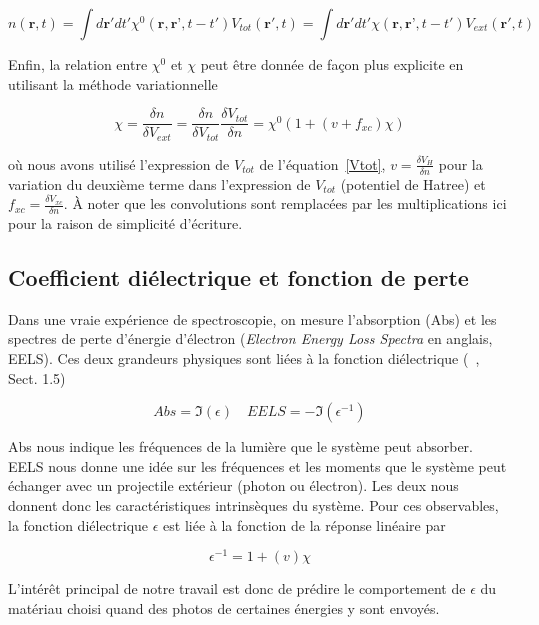 \documentclass[12pt, french]{report}
\theoremstyle{theoreme}
\begin{document}
$$
n(\textbf{r}, t) = \int d\textbf{r}' dt' \chi^0(\textbf{r}, \textbf{r'}, t-t') V_{tot}(\textbf{r}', t) = \int d\textbf{r}' dt' \chi(\textbf{r}, \textbf{r'}, t-t') V_{ext}(\textbf{r}', t)
$$


Enfin, la relation entre $\chi^0$ et $\chi$ peut être donnée de façon plus explicite en utilisant la méthode variationnelle

\begin{equation}
  \label{eqn-chi0chi}
  \chi = \frac{\delta n}{\delta V_{ext}}
       = \frac{\delta n}{\delta V_{tot}} \frac{\delta V_{tot}}{\delta n}
       = \chi^0 ( 1 + (v+f_{xc})\chi)
\end{equation}

où nous avons utilisé l'expression de $V_{tot}$ de l'équation~\ref{Vtot}, $v = \frac{\delta V_H}{\delta n}$ pour la variation du deuxième terme dans l'expression de $V_{tot}$ (potentiel de Hatree) et $f_{xc} = \frac{\delta V_{xc}}{\delta n}$. À noter que les convolutions sont remplacées par les multiplications ici pour la raison de simplicité d'écriture.


\subsection{Coefficient diélectrique et fonction de perte}
\label{subsec-eels}
Dans une vraie expérience de spectroscopie, on mesure l'absorption (Abs) et les spectres de perte d'énergie d'électron (\textit{Electron Energy Loss Spectra} en anglais, EELS). Ces deux grandeurs physiques sont liées à la fonction diélectrique (~\cite{Sot03}, Sect. 1.5)

$$
Abs = \mathfrak{I}(\epsilon) \quad EELS = -\mathfrak{I}(\epsilon^{-1})
$$

Abs nous indique les fréquences de la lumière que le système peut absorber. EELS nous donne une idée sur les fréquences et les moments que le système peut échanger avec un projectile extérieur (photon ou électron). Les deux nous donnent donc les caractéristiques intrinsèques du système. Pour ces observables, la fonction diélectrique $\epsilon$ est liée à la fonction de la réponse linéaire par~\cite{Sot03}

\begin{equation}\label{epsilon}
  \epsilon^{-1} = 1+ (v)\chi
\end{equation}

L'intérêt principal de notre travail est donc de prédire le comportement de $\epsilon$ du matériau choisi quand des photos de certaines énergies y sont envoyés.
\end{document}
